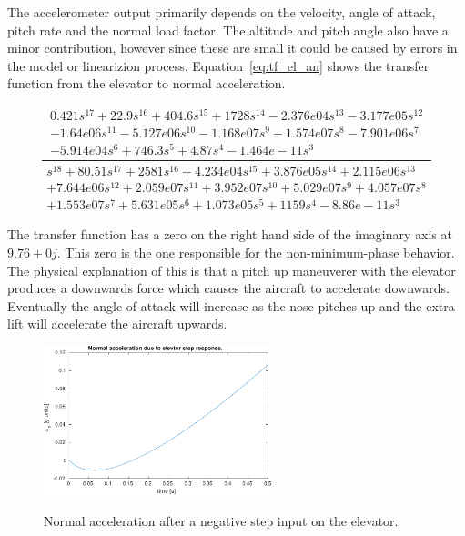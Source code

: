 The accelerometer output primarily depends on the velocity, angle of attack, pitch rate and the normal load factor. The altitude and pitch angle also have a minor contribution, however since these are small it could be caused by errors in the model or linearizion process. Equation~\ref{eq:tf_el_an} shows the transfer function from the elevator to normal acceleration.

\begin{equation}
    \label{eq:tf_el_an}
    \frac{
    \begin{matrix}
        0.421 s^{17} + 22.9 s^{16} + 404.6 s^{15} + 1728 s^{14} - 2.376e04 s^{13} - 3.177e05 s^{12} \\
        - 1.64e06 s^{11} - 5.127e06 s^{10} - 1.168e07 s^{9} - 1.574e07 s^{8} - 7.901e06 s^{7} \\
        - 5.914e04 s^{6} +  746.3 s^{5} + 4.87 s^{4} - 1.464e-11 s^{3}
    \end{matrix}
    }{
    \begin{matrix}
        s^{18} + 80.51 s^{17} + 2581 s^{16} + 4.234e04 s^{15} + 3.876e05 s^{14} + 2.115e06 s^{13} \\
        + 7.644e06 s^{12} + 2.059e07 s^{11} + 3.952e07 s^{10} + 5.029e07 s^{9} + 4.057e07 s^{8} \\
        + 1.553e07 s^{7} + 5.631e05 s^{6} + 1.073e05 s^{5} + 1159 s^{4} - 8.86e-11 s^{3}
    \end{matrix}
    }
\end{equation}

The transfer function has a zero on the right hand side of the imaginary axis at $9.76+0j$. This zero is the one responsible for the non-minimum-phase behavior. The physical explanation of this is that a pitch up maneuverer with the elevator produces a downwards force which causes the aircraft to accelerate downwards. Eventually the angle of attack will increase as the nose pitches up and the extra lift will accelerate the aircraft upwards.

\begin{figure}[ht]
    \centering
    \includegraphics[width=0.6\textwidth]{figures/an_elev_step}
    \label{fig:an_elev_step}
    \caption{Normal acceleration after a negative step input on the elevator.}
\end{figure}

